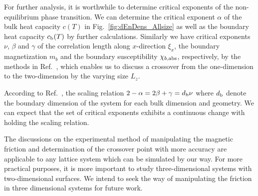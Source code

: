 %
For further analysis, it is worthwhile to determine critical exponents of the non-equilibrium phase transition. We can determine the critical exponent $\alpha$ of the bulk heat capacity $c(T)$ in Fig.~\ref{fig:dEnDens_Allsize} as well as the boundary heat capacity $c_{\rm b}(T)$ by further calculations. Similarly we have critical exponents $\nu$, $\beta$ and $\gamma$ of the correlation length along $x$-direction $\xi_{x}$, the boundary magnetization $m_{b}$ and the boundary susceptibility $\chi_{b,\rm abs}$, respectively, by the methods in Ref.~\cite{Hucht2009b}, which enables us to discuss a crossover from the one-dimension to the two-dimension by the varying size $L_{z}$.

According to Ref.~\cite{Hucht2009b}, the scaling relation $2-\alpha=2\beta+\gamma=d_{\rm b}\nu$ where $d_{\rm b}$ denote the boundary dimension of the system for each bulk dimension and geometry. We can expect that the set of critical exponents exhibits a continuous change with holding the scaling relation.

The discussions on the experimental method of manipulating the magnetic friction and determination of the crossover point with more accuracy are applicable to any lattice system which can be simulated by our way. For more practical purposes, it is more important to study three-dimensional systems with two-dimensional surfaces. We intend to seek the way of manipulating the friction in three dimensional systems for future work.
%
